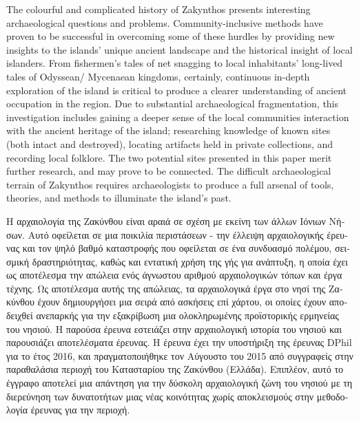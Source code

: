 The colourful and complicated history of Zakynthos presents interesting archaeological questions and problems. Community-inclusive methods have proven to be successful in overcoming some of these hurdles by providing new insights to the islands’ unique ancient landscape and the historical insight of local islanders.  From fishermen’s tales of net snagging to local inhabitants’ long-lived tales of Odyssean/ Mycenaean kingdoms, certainly, continuous in-depth exploration of the island is critical to produce a clearer understanding of ancient occupation in the region. Due to substantial archaeological fragmentation, this investigation includes gaining a deeper sense of the local communities interaction with the ancient heritage of the island; researching knowledge of known sites (both intact and destroyed), locating artifacts held in private collections, and recording local folklore. The two potential sites presented in this paper merit further research, and may prove to be connected. The difficult archaeological terrain of Zakynthos requires archaeologists to produce a full arsenal of tools, theories, and methods to illuminate the island’s past.
\myseparator
\begin{myabstract}
\foreignlanguage{greek}{Η αρχαιολογία της Ζακύνθου είναι αραιά σε σχέση με εκείνη των άλλων Ιόνιων Νήσων. Αυτό οφείλεται σε μια ποικιλία περιστάσεων - την έλλειψη αρχαιολογικής έρευνας και τον ψηλό βαθμό καταστροφής που οφείλεται σε ένα συνδυασμό πολέμου, σεισμική δραστηριότητας, καθώς και εντατική χρήση της γής για ανάπτυξη, η οποία έχει ως αποτέλεσμα την απώλεια ενός άγνωστου αριθμού αρχαιολογικών τόπων και έργα τέχνης. Ως αποτέλεσμα αυτής της απώλειας, τα αρχαιολογικά έργα στο νησί της Ζακύνθου έχουν δημιουργήσει μια σειρά από ασκήσεις επί χάρτου, οι οποίες έχουν αποδειχθεί ανεπαρκής για την εξακρίβωση μια ολοκληρωμένης προϊστορικής ερμηνείας του νησιού. Η παρούσα έρευνα εστειάζει στην αρχαιολογική ιστορία του νησιού και παρουσιάζει αποτελέσματα έρευνας. Η έρευνα έχει την υποστήριξη της έρευνας DPhil για το έτος 2016, και πραγματοποιήθηκε τον Αύγουστο του 2015 από συγγραφείς στην παραθαλάσια περιοχή του Κατασταρίου της Ζακύνθου (Ελλάδα). Επιπλέον, αυτό το έγγραφο αποτελεί μια απάντηση για την δύσκολη αρχαιολογική ζώνη του νησιού με τη διερεύνηση των δυνατοτήτων μιας νέας κοινότητας χωρίς αποκλεισμούς στην μεθοδολογία έρευνας για την περιοχή.}

\end{myabstract}
\printbibliography[heading=subbibnumbered] 
\label{Takkou:lastpage}
\closingarticle

